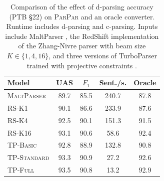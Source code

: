 \documentclass[11pt,letterpaper]{article}
\newcommand{\ParseName}{\textsc{ParPar}\xspace}
\begin{document}



\begin{table}
  \centering
  \small

  \begin{tabular}{|l|cccc|}
    \hline
    Model & UAS  & $F_1$ & Sent./s.  & Oracle  \\
    \hline

    \hline
    \textsc{MaltParser}  & 89.7 & 85.5 & 240.7& 87.8 \\
    \textsc{RS-K1}       & 90.1 & 86.6 & 233.9& 87.6 \\
    \textsc{RS-K4}       & 92.5 & 90.1 & 151.3& 91.5 \\
    \textsc{RS-K16}      & 93.1 & 90.6 & 58.6 & 92.4 \\
    \textsc{TP-Basic}    & 92.8 & 88.9 & 132.8& 90.8 \\
    \textsc{TP-Standard} & 93.3 & 90.9 & 27.2 & 92.6 \\
    \textsc{TP-Full}     & 93.5 & 90.8 & 13.2 & 92.9 \\
    \hline
  \end{tabular}


  
  \caption{Comparison of the effect of d-parsing accuracy (PTB \S 22)
    on \ParseName{} and an oracle converter.  Runtime includes
    d-parsing and c-parsing.  
    Inputs include 
 MaltParser \cite{nivre2006maltparser}, 
    the RedShift implementation of the Zhang-Nivre parser
    \cite{zhang2011transition} with beam size $K \in \{1, 4, 16\}$,
and three versions of TurboParser trained with projective constraints
    \cite{martins2013turning}.
\label{tab:oracle} }
\end{table}
\end{document}
